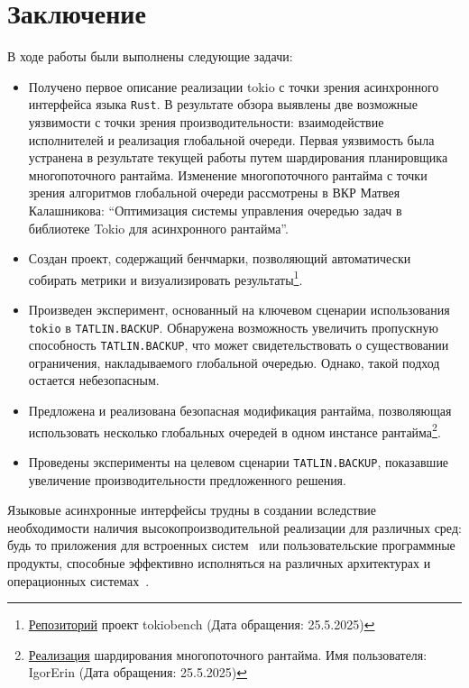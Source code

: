 
\section{Заключение}

В ходе работы были выполнены следующие задачи:

\begin{itemize}
    \item Получено первое описание реализации tokio с точки зрения асинхронного интерфейса языка \verb|Rust|. В результате обзора выявлены две возможные уязвимости с точки зрения производительности: взаимодействие исполнителей и реализация глобальной очереди. Первая уязвимость была устранена в результате текущей работы путем шардирования планировщика многопоточного рантайма. Изменение многопоточного рантайма с точки зрения алгоритмов глобальной очереди рассмотрены в ВКР Матвея Калашникова: ``Оптимизация системы управления очередью задач в библиотеке Tokio для асинхронного рантайма''.
    \item Создан проект, содержащий бенчмарки, позволяющий автоматически собирать метрики и визуализировать результаты\footnote{\href{https://github.com/IgorErin/tokiobench}{Репозиторий} проект tokiobench (Дата обращения: 25.5.2025)}.
    \item Произведен эксперимент, основанный на ключевом сценарии использования \verb|tokio| в \verb|TATLIN.BACKUP|. Обнаружена возможность увеличить пропускную способность \verb|TATLIN.BACKUP|, что может свидетельствовать о существовании ограничения, накладываемого глобальной очередью. Однако, такой подход остается небезопасным.
    \item Предложена и реализована безопасная модификация рантайма, позволяющая использовать несколько глобальных очередей в одном инстансе рантайма\footnote{\href{https://github.com/IgorErin/tokio/pull/3}{Реализация} шардирования многопоточного рантайма. Имя пользователя: IgorErin (Дата обращения: 25.5.2025)}.
    \item Проведены эксперименты на целевом сценарии \verb|TATLIN.BACKUP|, показавшие увеличение производительности предложенного решения.
\end{itemize}

Языковые асинхронные интерфейсы трудны в создании вследствие необходимости наличия высокопроизводительной реализации для различных сред: будь то приложения для встроенных систем~\cite{CPPCoroutinesOnMicrocontrollers, AsyncIOT} или пользовательские программные продукты, способные эффективно исполняться на различных архитектурах и операционных системах~\cite{CPPCoroutinesDesignAndImpl}.


